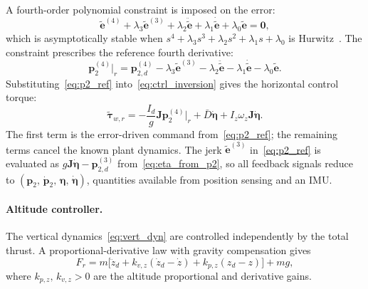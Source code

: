 A fourth-order polynomial constraint is imposed on the error:
\begin{equation}
    \tilde{\boldsymbol{e}}^{(4)}
        + \lambda_3\tilde{\boldsymbol{e}}^{(3)}
        + \lambda_2\ddot{\tilde{\boldsymbol{e}}}
        + \lambda_1\dot{\tilde{\boldsymbol{e}}}
        + \lambda_0\tilde{\boldsymbol{e}} = \boldsymbol{0},
    \label{eq:error_poly}
\end{equation}
which is asymptotically stable when $s^4 + \lambda_3 s^3 + \lambda_2 s^2
+ \lambda_1 s + \lambda_0$ is Hurwitz~\cite{bai2022splitflyerair}.  The
constraint prescribes the reference fourth derivative:
\begin{equation}
    \boldsymbol{p}_2^{(4)}\big|_r
        = \boldsymbol{p}_{2,d}^{(4)}
          - \lambda_3\tilde{\boldsymbol{e}}^{(3)}
          - \lambda_2\ddot{\tilde{\boldsymbol{e}}}
          - \lambda_1\dot{\tilde{\boldsymbol{e}}}
          - \lambda_0\tilde{\boldsymbol{e}}.
    \label{eq:p2_ref}
\end{equation}
Substituting~\eqref{eq:p2_ref} into~\eqref{eq:ctrl_inversion} gives the
horizontal control torque:
\begin{equation}
    \tilde{\boldsymbol{\tau}}_{w,r}
        = -\frac{I_d}{g}\boldsymbol{J}\boldsymbol{p}_2^{(4)}\big|_r
          + \bar{D}\dot{\boldsymbol{\eta}}
          + I_z\omega_z\boldsymbol{J}\dot{\boldsymbol{\eta}}.
    \label{eq:ctrl_law}
\end{equation}
The first term is the error-driven command from~\eqref{eq:p2_ref}; the
remaining terms cancel the known plant dynamics.  The jerk
$\tilde{\boldsymbol{e}}^{(3)}$ in~\eqref{eq:p2_ref} is evaluated as
$g\boldsymbol{J}\dot{\boldsymbol{\eta}} - \boldsymbol{p}_{2,d}^{(3)}$
from~\eqref{eq:eta_from_p2}, so all feedback signals reduce to
$(\boldsymbol{p}_2,\,\dot{\boldsymbol{p}}_2,\,\boldsymbol{\eta},\,
\dot{\boldsymbol{\eta}})$, quantities available from position sensing and
an IMU.

\paragraph{Altitude controller.}
The vertical dynamics~\eqref{eq:vert_dyn} are controlled independently by
the total thrust.  A proportional-derivative law with gravity compensation
gives
\begin{equation}
    F_r = m\bigl[
        \ddot{z}_d
        + k_{v,z}(\dot{z}_d - \dot{z})
        + k_{p,z}(z_d - z)
    \bigr] + mg,
    \label{eq:alt_ctrl}
\end{equation}
where $k_{p,z},\,k_{v,z} > 0$ are the altitude proportional and derivative
gains.


